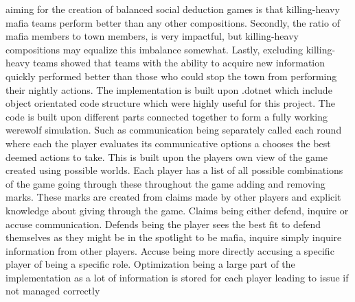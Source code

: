 aiming for the creation of balanced social deduction games is that killing-heavy mafia teams perform better than any other compositions. Secondly, the ratio of mafia members to town members, is very impactful, but killing-heavy compositions may equalize this imbalance somewhat. Lastly, excluding killing-heavy teams showed that teams with the ability to acquire new information quickly performed better than those who could stop the town from performing their nightly actions.
The implementation is built upon .dotnet which include object orientated code
structure which were highly useful for this project. The code is built upon
different parts connected together to form a fully working werewolf simulation.
Such as communication being separately called each round where each the player
evaluates its communicative options a chooses the best deemed actions to take.
This is built upon the players own view of the game created using possible
worlds. Each player has a list of all possible combinations of the game going
through these throughout the game adding and removing marks. These marks are
created from claims made by other players and explicit knowledge about giving
through the game. Claims being either defend, inquire or accuse communication.
Defends being the player sees the best fit to defend themselves as they might
be in the spotlight to be mafia, inquire simply inquire information from other
players. Accuse being more directly accusing a specific player of being a
specific role. Optimization being a large part of the implementation as a lot
of information is stored for each player leading to issue if not managed
correctly
\twocolumn